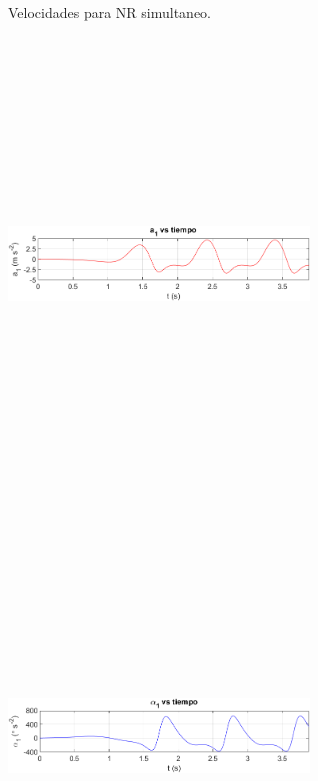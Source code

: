 \documentclass[12pt]{article}
\begin{document}
\begin{multicols}{2}
\begin{figure} [H]
        \caption{Velocidades para NR simultaneo.}
        \label{}
    \end{figure}
\begin{figure} [H]
        \centerline{\includegraphics[width=8cm, height=12cm,keepaspectratio]{NR Simultaneo/a1.png}}
    \end{figure}
    \vspace{-25pt}
        \begin{figure} [H]
        \centerline{\includegraphics[width=8cm, height=12cm,keepaspectratio]{NR Simultaneo/alpha1.png}}

\end{figure}
\end{multicols}
\end{document}
